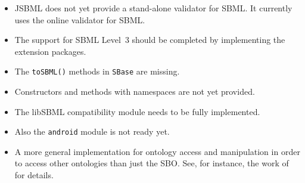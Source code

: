 \begin{itemize}
\item JSBML does not yet provide a stand-alone validator for SBML. It currently
uses the online validator for SBML.
\item The support for SBML Level~3 should be completed by
implementing the extension packages.
\item The \texttt{toSBML()}
methods in \texttt{SBase} are missing.
\item Constructors and methods with namespaces are not yet provided.
\item The libSBML compatibility module
needs to be fully implemented.
\item Also the \texttt{android} module is not ready yet.
\item A more general implementation for ontology access and manipulation in
order to access other ontologies than just the SBO. See, for instance, the work
of \citet{Courtot2011a} for details.
\end{itemize}
